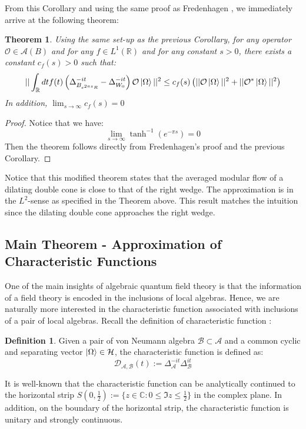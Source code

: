 \documentclass[a4paper,11pt]{article}
\newtheorem{theorem}{Theorem}
\theoremstyle{definition}
\newtheorem{definition}{Definition}[section]
\newcommand{\lb}{\left(}
\newcommand{\rb}{\right)}
\begin{document}
From this Corollary and using the same proof as Fredenhagen \cite{fredenhagen}, we immediately arrive at the following theorem:
\begin{theorem}\label{theorem:modifiedfredenhagen}
    Using the same set-up as the previous Corollary, for any operator $\mathcal{O}\in \mathcal{A}(B)$ and for any $f\in L^1(\mathbb{R})$ and for any constant $s > 0$, there exists a constant $c_f(s) > 0$ such that:
    \begin{equation}
        ||\int_\mathbb{R} dt f(t)\lb\Delta^{-it}_{B_{e^{2\pi s}R}} - \Delta^{-it}_{W_0}\rb\mathcal{O}\ket{\Omega}||^2 \leq c_f(s)\lb||\mathcal{O}\ket{\Omega}||^2 + ||\mathcal{O}^*\ket{\Omega}||^2\rb
    \end{equation}
    In addition, $\lim_{s\rightarrow \infty}c_f(s) = 0$
\end{theorem}
\begin{proof}
    Notice that we have:
    \begin{equation}
        \lim_{s\rightarrow\infty}\tanh^{-1}(e^{-\pi s}) = 0
    \end{equation}
    Then the theorem follows directly from Fredenhagen's proof and the previous Corollary.
\end{proof}
Notice that this modified theorem states that the averaged modular flow  of a dilating double cone is close to that of the right wedge. The approximation is in the $L^2$-sense as specified in the Theorem above. This result matches the intuition since the dilating double cone approaches the right wedge.
\subsection{Main Theorem - Approximation of Characteristic Functions}\label{subsection:maintheorem}
One of the main insights of algebraic quantum field theory is that the information of a field theory is encoded in the inclusions of local algebras. Hence, we are naturally more interested in the characteristic function associated with inclusions of a pair of local algebras. Recall the definition of characteristic function \cite{revolutionizing}:
\begin{definition}
    Given a pair of von Neumann algebra $\mathcal{B}\subset\mathcal{A}$ and a common cyclic and separating vector $\ket{\Omega}\in\mathcal{H}$, the characteristic function is defined as:
    \begin{equation}
        \mathcal{D}_{\mathcal{A},\mathcal{B}}(t) := \Delta_\mathcal{A}^{-it}\Delta_\mathcal{B}^{it}
    \end{equation}
\end{definition}
It is well-known that the characteristic function can be analytically continued to the horizontal strip $S(0, \frac{1}{2}) := \{z\in\mathbb{C}:0\leq \Im{z} \leq \frac{1}{2}\}$ in the complex plane. In addition, on the boundary of the horizontal strip, the characteristic function is unitary and strongly continuous. 
\end{document}
